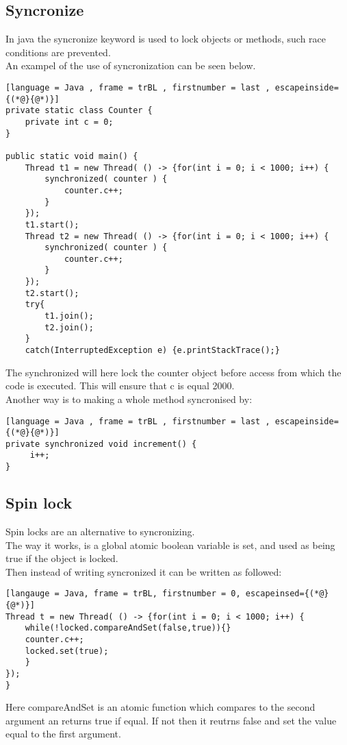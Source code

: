 \documentclass[12pt, a4paper]{article}
\begin{document}
	\subsection{Syncronize}
		In java the syncronize keyword is used to lock objects or methods, such race conditions are prevented.\\
		An exampel of the use of syncronization can be seen below.
\begin{lstlisting}[language = Java , frame = trBL , firstnumber = last , escapeinside={(*@}{@*)}]
private static class Counter {
	private int c = 0;
}

public static void main() {
	Thread t1 = new Thread( () -> {for(int i = 0; i < 1000; i++) {
		synchronized( counter ) {
			counter.c++;
		}
	});
	t1.start();
	Thread t2 = new Thread( () -> {for(int i = 0; i < 1000; i++) {
		synchronized( counter ) {
			counter.c++;
		}
	});
	t2.start();
	try{
		t1.join();
		t2.join();
	}
	catch(InterruptedException e) {e.printStackTrace();}
\end{lstlisting}	
	The synchronized will here lock the counter object before access from which the code is executed. This will ensure that c is equal 2000.\\
	Another way is to making a whole method syncronised by:
	\begin{lstlisting}[language = Java , frame = trBL , firstnumber = last , escapeinside={(*@}{@*)}]
private synchronized void increment() {
	 i++;
}
\end{lstlisting}
		\subsection{Spin lock}
			Spin locks are an alternative to syncronizing.\\
			The way it works, is a global atomic boolean variable is set, and used as being true if the object is locked.\\
			Then instead of writing syncronized it can be written as followed:
\begin{lstlisting}[langauge = Java, frame = trBL, firstnumber = 0, escapeinsed={(*@}{@*)}]
Thread t = new Thread( () -> {for(int i = 0; i < 1000; i++) {
	while(!locked.compareAndSet(false,true)){}
	counter.c++;
	locked.set(true);
	}
});
}
\end{lstlisting}
			Here compareAndSet is an atomic function which compares to the second argument an returns true if equal. If not then it reutrns false and set the value equal to the first argument.\\
			
\end{document}
